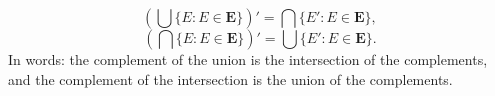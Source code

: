 $$\left(\bigcup \{E: E \in \mathbf{E}\}\right)' = \bigcap \{E': E \in \mathbf{E}\},$$
$$\left(\bigcap \{E: E \in \mathbf{E}\}\right)' = \bigcup \{E': E \in \mathbf{E}\}.$$
In words: the complement of the union is the intersection of the complements, and the complement of the intersection is the union of the complements.
